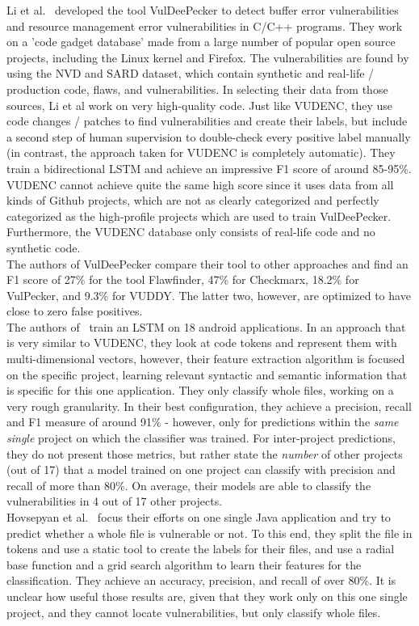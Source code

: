 \documentclass[
a4paper,
pagesize,
pdftex,
12pt,
ngerman,
fleqn,
final,
]{scrartcl}
\begin{document}
	Li et al.~\cite{Li.2018} developed the tool VulDeePecker to detect buffer error vulnerabilities and resource management error vulnerabilities in C/C++ programs. They work on a 'code gadget database' made from a large number of popular open source projects, including the Linux kernel and Firefox. The vulnerabilities are found by using the NVD and SARD dataset, which contain synthetic and real-life / production code, flaws, and vulnerabilities. In selecting their data from those sources, Li et al work on very high-quality code. Just like VUDENC, they use code changes / patches to find vulnerabilities and create their labels, but include a second step of human supervision to double-check every positive label manually (in contrast, the approach taken for VUDENC is completely automatic). They train a bidirectional LSTM and achieve an impressive F1 score of around 85-95\%. VUDENC cannot achieve quite the same high score since it uses data from all kinds of Github projects, which are not as clearly categorized and perfectly categorized as the high-profile projects which are used to train VulDeePecker. Furthermore, the VUDENC database only consists of real-life code and no synthetic code.\\
	The authors of VulDeePecker compare their tool to other approaches and find an F1 score of 27\% for the tool Flawfinder, 47\% for Checkmarx, 18.2\% for VulPecker, and 9.3\% for VUDDY. The latter two, however, are optimized to have close to zero false positives.\\	
	The authors of~\cite{Dam.2017} train an LSTM on 18 android applications. In an approach that is very similar to VUDENC, they look at code tokens and represent them with multi-dimensional vectors, however, their feature extraction algorithm is focused on the specific project, learning relevant syntactic and semantic information that is specific for this one application. They only classify whole files, working on a very rough granularity. In their best configuration, they achieve a precision, recall and F1 measure of around 91\% - however, only for predictions within the \textit{same single} project on which the classifier was trained. For inter-project predictions, they do not present those metrics, but rather state the \textit{number} of other projects (out of 17) that a model trained on one project can classify with precision and recall of more than 80\%. On average, their models are able to classify the vulnerabilities in 4 out of 17 other projects.\\	
	Hovsepyan et al.~\cite{Hovsepyan.2012} focus their efforts on one single Java application and try to predict whether a whole file is vulnerable or not. To this end, they split the file in tokens and use a static tool to create the labels for their files, and use a radial base function and a grid search algorithm to learn their features for the classification. They achieve an accuracy, precision, and recall of over 80\%. It is unclear how useful those results are, given that they work only on this one single project, and they cannot locate vulnerabilities, but only classify whole files. 
	
\end{document}
